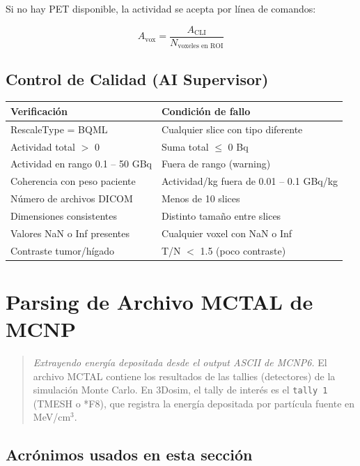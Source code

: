 \documentclass[12pt,a4paper]{article}
\begin{document}
Si no hay PET disponible, la actividad se acepta por línea de comandos:

$$A_{\text{vox}} = \frac{A_{\text{CLI}}}{N_{\text{voxeles en ROI}}}$$

\subsection*{Control de Calidad (AI Supervisor)}

\begin{tabular}{p{5cm} p{10cm}}
\toprule
\textbf{Verificación} & \textbf{Condición de fallo} \\
\midrule
RescaleType = BQML & Cualquier slice con tipo diferente \\
Actividad total $>$ 0 & Suma total $\leq$ 0 Bq \\
Actividad en rango 0.1 -- 50 GBq & Fuera de rango (warning) \\
Coherencia con peso paciente & Actividad/kg fuera de 0.01 -- 0.1 GBq/kg \\
Número de archivos DICOM & Menos de 10 slices \\
Dimensiones consistentes & Distinto tamaño entre slices \\
Valores NaN o Inf presentes & Cualquier voxel con NaN o Inf \\
Contraste tumor/hígado & T/N $<$ 1.5 (poco contraste) \\
\bottomrule
\end{tabular}

\newpage

\section{Parsing de Archivo MCTAL de MCNP}

\begin{quote}
\textit{Extrayendo energía depositada desde el output ASCII de MCNP6.} El archivo MCTAL contiene los resultados de las tallies (detectores) de la simulación Monte Carlo. En 3Dosim, el tally de interés es el \texttt{tally 1} (TMESH o *F8), que registra la energía depositada por partícula fuente en MeV/cm$^3$.
\end{quote}

\subsection*{Acrónimos usados en esta sección}
\end{document}
